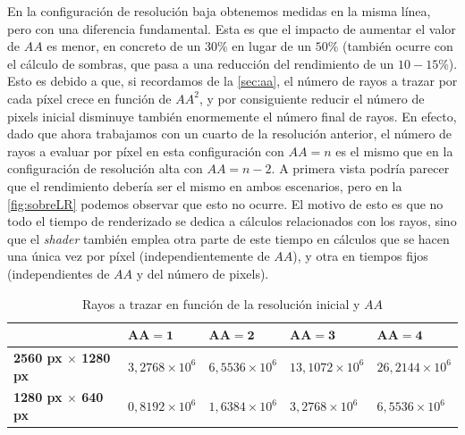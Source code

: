 En la configuración de resolución baja obtenemos medidas en la misma línea, pero con una diferencia fundamental. Esta es que el impacto de aumentar el valor de $AA$ es menor, en concreto de un $30\%$ en lugar de un $50\%$ (también ocurre con el cálculo de sombras, que pasa a una reducción del rendimiento de un $10-15\%$). Esto es debido a que, si recordamos de la \autoref{sec:aa}, el número de rayos a trazar por cada píxel crece en función de $AA^2$, y por consiguiente reducir el número de pixels inicial disminuye también enormemente el número final de rayos. En efecto, dado que ahora trabajamos con un cuarto de la resolución anterior, el número de rayos a evaluar por píxel en esta configuración con $AA=n$ es el mismo que en la configuración de resolución alta con $AA=n-2$. A primera vista podría parecer que el rendimiento debería ser el mismo en ambos escenarios, pero en la \autoref{fig:sobreLR} podemos observar que esto no ocurre. El motivo de esto es que no todo el tiempo de renderizado se dedica a cálculos relacionados con los rayos, sino que el \textit{shader} también emplea otra parte de este tiempo en cálculos que se hacen una única vez por píxel (independientemente de $AA$), y otra en tiempos fijos (independientes de $AA$ y del número de pixels).
\begin{table}[!ht]
    \centering
    \begin{tabular}{|l|l|l|l|l|}
        \hline
        & $\boldsymbol{AA=1}$ & $\boldsymbol{AA=2}$ & $\boldsymbol{AA=3}$ & $\boldsymbol{AA=4}$ \\ \hline
        \textbf{2560 px $\times$ 1280 px} & $3,2768 \times 10^6$  & $6,5536  \times 10^6$ & $13,1072  \times 10^6$ & $26,2144 \times 10^6$ \\ \hline
        \textbf{1280 px $\times$ 640 px} & $0,8192  \times 10^6$ & $1,6384  \times 10^6$  & $3,2768 \times 10^6$ &  $6,5536  \times 10^6$ \\ \hline
    \end{tabular}
    \caption{Rayos a trazar en función de la resolución inicial y $AA$}
\end{table}

